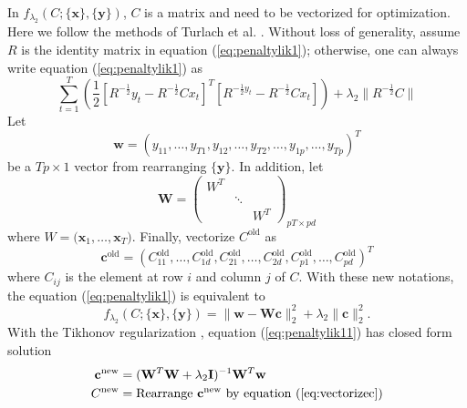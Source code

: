 \documentclass[fleqn]{article}
\let\oldref\ref
\renewcommand{\ref}[1]{(\oldref{#1})}
\newcommand{\T}{T}
\begin{document}
In $f_{\lambda_2}(C;\{\mathbf{x}\},\{\mathbf{y}\})$, $C$ is a matrix and need to be vectorized for optimization. Here we follow the methods of Turlach et al. \cite{turlach2005simultaneous}. Without loss of generality, assume $R$ is the identity matrix in equation \ref{eq:penaltylik1}; otherwise, one can always write equation \ref{eq:penaltylik1} as
\begin{equation*}
\sum\limits_{t=1}^{T}\left(\frac{1}{2}[R^{-\frac{1}{2}}y_t-R^{-\frac{1}{2}}Cx_t]^{\T}[R^{-\frac{1}{2}y_t}-R^{-\frac{1}{2}}Cx_t]\right) + \lambda_2 \|R^{-\frac{1}{2}}C\|
\end{equation*}
Let
\begin{equation*}
\mathbf{w} = (y_{11},\ldots,y_{T1},y_{12},\ldots,y_{T2},\ldots,y_{1p},\ldots,y_{Tp})^{\T}
\end{equation*}
be a $Tp\times 1$ vector from rearranging  $\{\mathbf{y}\}$. In addition, let
\[
\mathbf{W} = \begin{pmatrix}
W^{\T}&&\\
&\ddots&\\
&&W^{\T}
\end{pmatrix}_{pT\times pd}
\]
where $W=\biggl(\mathbf{x}_1,\ldots,\mathbf{x}_{T}\biggr)$. Finally, vectorize $C^{\text{old}}$ as
\begin{equation}\label{eq:vectorizec}
\mathbf{c}^{\text{old}} = (C_{11}^{\text{old}},\ldots,C_{1d}^{\text{old}},C_{21}^{\text{old}},\ldots,C_{2d}^{\text{old}},C_{p1}^{\text{old}},\ldots,C_{pd}^{\text{old}})^{\T}
\end{equation}
where $C_{ij}$ is the element at row $i$ and column $j$ of $C$. With these new notations, the equation \ref{eq:penaltylik1} is equivalent to
\begin{equation}\label{eq:penaltylik11}
f_{\lambda_2}(C;\{\mathbf{x}\},\{\mathbf{y}\}) = \|\mathbf{w}  - \mathbf{Wc}\|_2^2 + \lambda_2\|\mathbf{c}\|_2^2.
\end{equation}
With the Tikhonov regularization \cite{tikhonov1943stability}, equation \ref{eq:penaltylik11} has closed form solution
\begin{equation}\label{eq:updatec}
\begin{aligned}
\mathbf{c}^{\text{new}} &= (\mathbf{W}^{\T}\mathbf{W} + \lambda_2\mathbf{I})^{-1}\mathbf{W}^{\T}\mathbf{w}\\
C^{\text{new}} &=\text{Rearrange } \mathbf{c}^{\text{new}} \text{ by equation }\ref{eq:vectorizec}
\end{aligned}
\end{equation}
\end{document}
